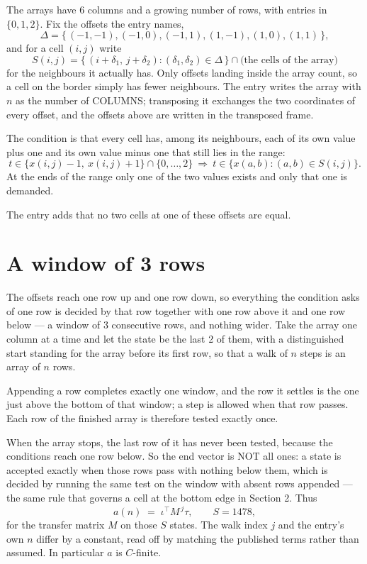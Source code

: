 \documentclass[11pt,a4paper]{article}
\theoremstyle{plain}
\theoremstyle{definition}
\begin{document}
The arrays have $6$ columns and a growing number of rows, with entries in $\{0,1,2\}$. Fix the
offsets the entry names,
\[
\Delta=\{\,(-1,-1), (-1,0), (-1,1), (1,-1), (1,0), (1,1)\,\},
\]
and for a cell $(i,j)$ write
\[
S(i,j)=\{\,(i+\delta_1,\,j+\delta_2) : (\delta_1,\delta_2)\in\Delta\,\}\cap
\text{(the cells of the array)}
\]
for the neighbours it actually has. Only offsets landing inside the array count, so a cell on
the border simply has fewer neighbours. The entry writes the array with $n$ as the number of COLUMNS; transposing it exchanges the two coordinates of every offset, and the offsets above are written in the transposed frame.

The condition is that every cell has, among its neighbours, each of its own value plus one and its own value minus one that still lies in the range:
\[
t\in\{x(i,j)-1,\ x(i,j)+1\}\cap\{0,\dots,2\}\ \Longrightarrow\ t\in\{x(a,b):(a,b)\in S(i,j)\}.
\]
At the ends of the range only one of the two values exists and only that one is demanded.

The entry adds that no two cells at one of these offsets are equal.

\section{A window of 3 rows}

The offsets reach one row up and one row down, so everything the condition asks of one row is
decided by that row together with one row above it and one row below --- a window of
$3$ consecutive rows, and nothing wider. Take the array one column at a time and
let the state be the last 2 of them, with a distinguished start standing for the array before its
first row, so that a walk of $n$ steps is an array of $n$ rows.

Appending a row completes exactly one window, and the row it settles is the one just above the bottom of that window; a step is
allowed when that row passes. Each row of the finished array is therefore tested exactly once.

When the array stops, the last row of it has never been tested, because the
conditions reach one row below. So the end vector is NOT all ones: a state is accepted exactly when
those rows pass with nothing below them, which is decided by running the same test on the window
with absent rows appended --- the same rule that governs a cell at the bottom edge in
Section 2.
Thus
\[
a(n)\;=\;\iota^{\!\top}M^{\,j}\tau ,\qquad S=1478,
\]
for the transfer matrix $M$ on those $S$ states. The walk index $j$ and the entry's own $n$
differ by a constant, read off by matching the published terms rather than assumed. In
particular $a$ is $C$-finite.
\end{document}
